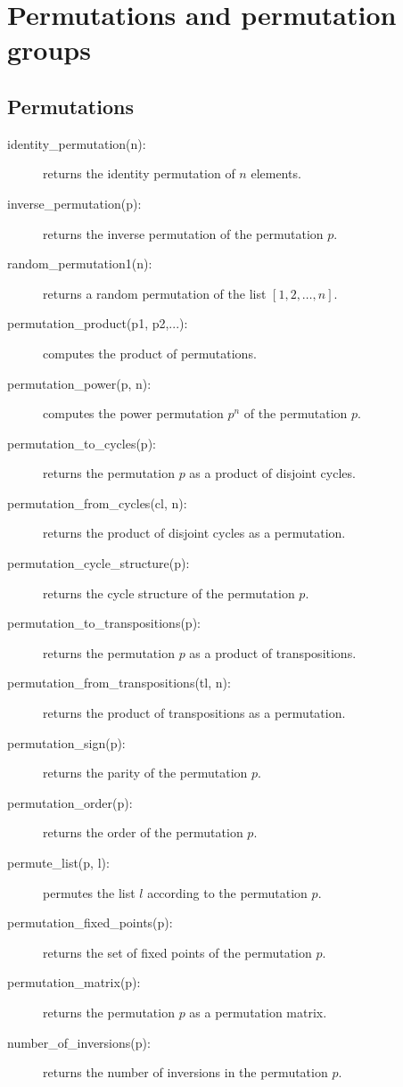 \documentclass[11pt]{article}
\begin{document}
\section{Permutations and permutation groups}

\subsection{Permutations}

\begin{description}
  \item [identity\_permutation(n):] returns the identity permutation
    of $n$ elements.
  \item [inverse\_permutation(p):] returns the inverse permutation of
    the permutation $p$.
  \item [random\_permutation1(n):] returns a random permutation of the
    list $[1,2,\ldots,n]$.
  \item [permutation\_product(p1, p2,...):] computes the product of
    permutations.
  \item [permutation\_power(p, n):] computes the power permutation
    $p^n$ of the permutation $p$.
  \item [permutation\_to\_cycles(p):] returns the permutation $p$ as a
    product of disjoint cycles.
  \item [permutation\_from\_cycles(cl, n):] returns the product of
    disjoint cycles as a permutation.
  \item [permutation\_cycle\_structure(p):] returns the cycle
    structure of the permutation $p$.
  \item [permutation\_to\_transpositions(p):] returns the permutation
    $p$ as a product of transpositions.
  \item [permutation\_from\_transpositions(tl, n):] returns the
    product of transpositions as a permutation.
  \item [permutation\_sign(p):] returns the parity of the permutation
    $p$.
  \item [permutation\_order(p):] returns the order of the permutation
    $p$.
  \item [permute\_list(p, l):] permutes the list $l$ according to the
    permutation $p$.
  \item [permutation\_fixed\_points(p):] returns the set of fixed
    points of the permutation $p$.
  \item [permutation\_matrix(p):] returns the permutation $p$ as a
    permutation matrix.
  \item [number\_of\_inversions(p):] returns the number of inversions
    in the permutation $p$.
\end{description}
\end{document}
